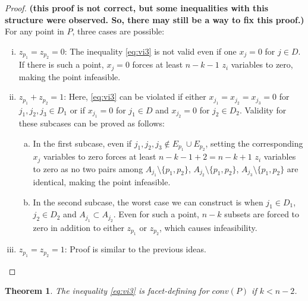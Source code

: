 \documentclass[12pt]{article}
\newcommand{\sm}{\setminus}
\newtheorem{thm}{Theorem}
\begin{document}
\begin{proof}
{\large\bf (this proof is not correct, but some inequalities with this structure were observed. So, there may still be a way to fix this proof.)} For any point in $P$, three cases are possible:
\begin{enumerate}[(i)]
\item $z_{p_1} = z_{p_2} = 0$: The inequality \eqref{eq:vi3} is not valid even if one $x_j = 0$ for $j \in D$. If there is such a point, $x_j = 0$ forces at least $n-k-1$ $z_i$ variables to zero, making the point infeasible.
\item $z_{p_1} + z_{p_2} = 1$: Here, \eqref{eq:vi3} can be violated if either $x_{j_1} = x_{j_2} = x_{j_3} = 0$ for $j_1,j_2,j_3 \in D_1$ or if $x_{j_1} = 0$ for $j_1 \in D$ and $x_{j_2} = 0$ for $j_2 \in D_2$. Validity for these subcases can be proved as follows:
\begin{enumerate}[(a)]
\item In the first subcase, even if $j_1,j_2,j_3 \notin E_{p_1} \cup E_{p_2}$, setting the corresponding $x_j$ variables to zero forces at least $n-k-1+2 = n-k+1$ $z_i$ variables to zero as no two pairs among $A_{j_1} \sm \{p_1,p_2\}$, $A_{j_2} \sm \{p_1,p_2\}$, $A_{j_3} \sm \{p_1,p_2\}$ are identical, making the point infeasible.
\item In the second subcase, the worst case we can construct is when $j_1 \in D_1$, $j_2 \in D_2$ and $A_{j_1} \subset A_{j_2}$. Even for such a point, $n-k$ subsets are forced to zero in addition to either $z_{p_1}$ or $z_{p_2}$, which causes infeasibility.
\end{enumerate}
\item $z_{p_1} = z_{p_2} = 1$: Proof is similar to the previous ideas.
\end{enumerate}
\end{proof}
\begin{thm}
The inequality \eqref{eq:vi3} is facet-defining for $conv(P)$ if $k<n-2$.
\end{thm}
\end{document}
